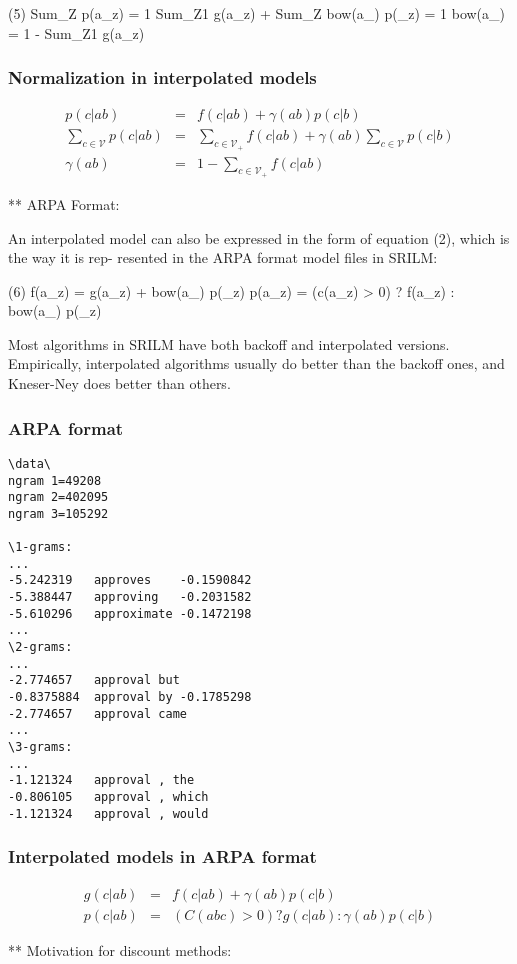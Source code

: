 \documentclass[ignorenonframetext]{beamer}
\newcommand{\vocab}{\mathcal{V}}
\begin{document}
       (5)  Sum_Z  p(a_z) = 1
            Sum_Z1 g(a_z) + Sum_Z bow(a_) p(_z) = 1
            bow(a_) = 1 - Sum_Z1 g(a_z)

\begin{frame}\frametitle{Normalization in interpolated models}
\begin{eqnarray*}
p(c|ab) &=& f(c|ab) + \gamma(ab) p(c|b) \\
\sum_{c\in\vocab} p(c|ab) &=& \sum_{c\in\vocab_{+}} f(c|ab) +
\gamma(ab) \sum_{c\in\vocab} p(c|b) \\
\gamma(ab) &=& 1 - \sum_{c\in\vocab_{+}} f(c|ab)
\end{eqnarray*}
\end{frame}

** ARPA Format:

       An interpolated model can also be expressed in the form of equation (2), which is the way it is  rep-
       resented in the ARPA format model files in SRILM:

       (6)  f(a_z) = g(a_z) + bow(a_) p(_z)
            p(a_z) = (c(a_z) > 0) ? f(a_z) : bow(a_) p(_z)

       Most  algorithms  in  SRILM  have  both backoff and interpolated versions.  Empirically, interpolated
       algorithms usually do better than the backoff ones, and Kneser-Ney does better than others.

\begin{frame}[fragile]\frametitle{ARPA format}
\scriptsize
\begin{verbatim}
\data\
ngram 1=49208
ngram 2=402095
ngram 3=105292

\1-grams:
...
-5.242319	approves	-0.1590842
-5.388447	approving	-0.2031582
-5.610296	approximate	-0.1472198
...
\2-grams:
...
-2.774657	approval but
-0.8375884	approval by	-0.1785298
-2.774657	approval came
...
\3-grams:
...
-1.121324	approval , the
-0.806105	approval , which
-1.121324	approval , would
\end{verbatim}
\end{frame}

\begin{frame}\frametitle{Interpolated models in ARPA format}
\begin{eqnarray*}
g(c|ab) &=& f(c|ab) + \gamma(ab) p(c|b) \\
p(c|ab) &=& (C(abc) > 0) ? g(c|ab) : \gamma(ab) p(c|b)
\end{eqnarray*}
\end{frame}

** Motivation for discount methods:
\end{document}
